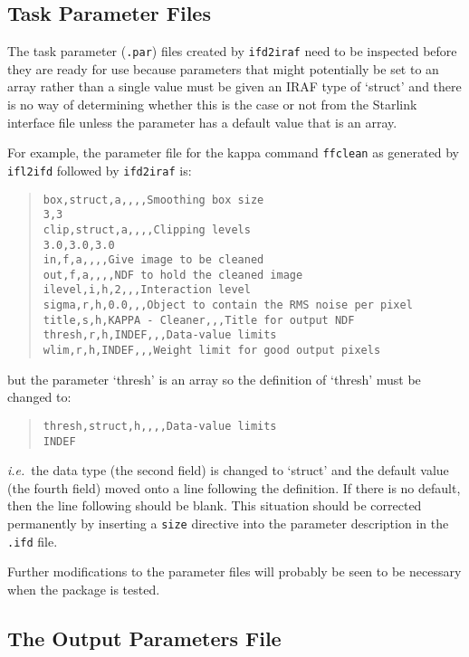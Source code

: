 \documentclass[twoside,11pt]{article}
\newcommand{\xref}[3]{#1}
\newcommand{\xlabel}[1]{}
\begin{document}
\subsection{\xlabel{task_parameter_files}\label{parfiles}Task Parameter Files}
The task parameter (\texttt{.par}) files created by 
\xref{\texttt{ifd2iraf}}{ssn68}{producing_iraf_files_from_an_ifd} 
need to be
inspected before they are ready for use because parameters that might 
potentially be set to an array rather than a single value must be given
an IRAF type of `struct' and there is no way of determining whether this
is the case or not from the Starlink interface file unless the parameter has
a default value that is an array.

For example, the parameter file for the kappa command \texttt{ffclean} as 
generated by 
\xref{\texttt{ifl2ifd}}{ssn68}{creating_ifds_from_interface_files} 
followed by 
\xref{\texttt{ifd2iraf}}{ssn68}{producing_iraf_files_from_an_ifd} 
is:
\begin{quote} \begin{verbatim}
box,struct,a,,,,Smoothing box size
3,3
clip,struct,a,,,,Clipping levels
3.0,3.0,3.0
in,f,a,,,,Give image to be cleaned
out,f,a,,,,NDF to hold the cleaned image
ilevel,i,h,2,,,Interaction level
sigma,r,h,0.0,,,Object to contain the RMS noise per pixel
title,s,h,KAPPA - Cleaner,,,Title for output NDF
thresh,r,h,INDEF,,,Data-value limits
wlim,r,h,INDEF,,,Weight limit for good output pixels
\end{verbatim} \end{quote}
but the parameter `thresh' is an array so the definition of `thresh' 
must be changed to:
\begin{quote} \begin{verbatim}
thresh,struct,h,,,,Data-value limits
INDEF
\end{verbatim} \end{quote}
\textit{i.e.}\ the data type (the second field) is changed to `struct' and the
default value (the fourth field) moved onto a line following the definition.
If there is no default, then the line following should be blank. 
This situation should be corrected permanently by inserting a
\xref{\texttt{size}}{ssn68}{size} directive into the parameter description in 
the \texttt{.ifd} file.

Further modifications to the parameter files will probably be seen to be 
necessary when the package is tested. 

\subsection{\xlabel{the_output_parameters_file}The Output Parameters File}
\end{document}
